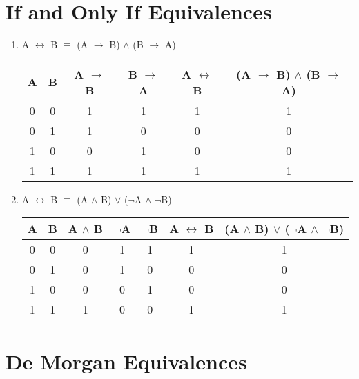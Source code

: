\documentclass{report}
\begin{document}
\section{If and Only If Equivalences}
\begin{enumerate}

  \item A $\leftrightarrow$ B $\equiv$ (A $\to$ B) $\land$ (B $\to$ A)

\begin{center}
  \begin{tabular} {| c | c | c | c | c | c |}
    \hline
    A & B & A $\to$ B & B $\to$ A & A $\leftrightarrow$ B & (A $\to$ B) $\land$ (B $\to$ A) \\ \hline
    0 & 0 & 1 & 1 & 1 & 1 \\
    0 & 1 & 1 & 0 & 0 & 0 \\
    1 & 0 & 0 & 1 & 0 & 0 \\
    1 & 1 & 1 & 1 & 1 & 1 \\ \hline
  \end{tabular} 
\end{center}

  \item A $\leftrightarrow$ B $\equiv$ (A $\land$ B) $\lor$ ($\neg$A $\land$ $\neg$B)

\begin{center}
  \begin{tabular} {| c | c | c | c | c | c | c |}
    \hline
    A & B & A $\land$ B & $\neg$A & $\neg$B & A $\leftrightarrow$ B & (A $\land$ B) $\lor$ ($\neg$A $\land$ $\neg$B) \\ \hline
    0 & 0 & 0 & 1 & 1 & 1 & 1 \\
    0 & 1 & 0 & 1 & 0 & 0 & 0 \\
    1 & 0 & 0 & 0 & 1 & 0 & 0 \\
    1 & 1 & 1 & 0 & 0 & 1 & 1 \\ \hline
  \end{tabular} 
\end{center}
\end{enumerate}

\section{De Morgan Equivalences}
\end{document}
